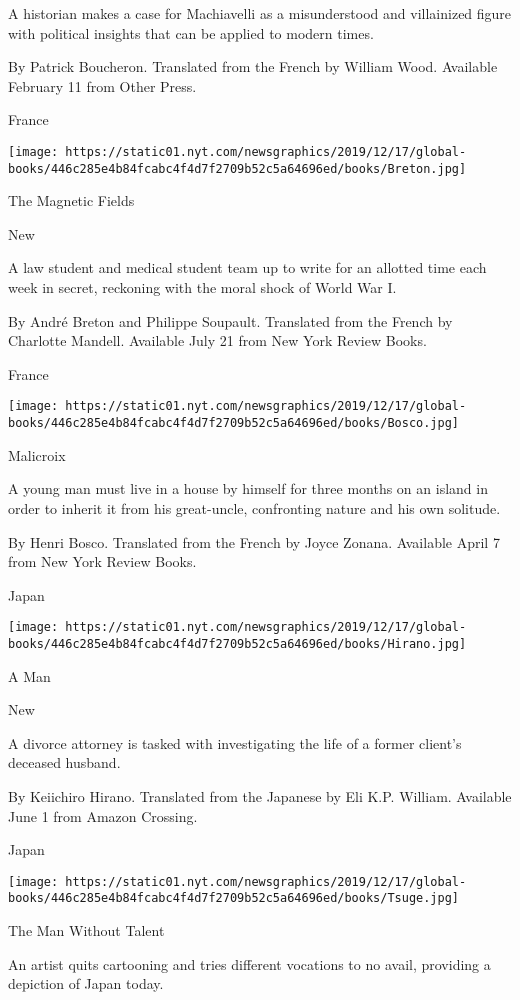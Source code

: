 A historian makes a case for Machiavelli as a misunderstood and
villainized figure with political insights that can be applied to modern
times.

 By Patrick Boucheron. Translated from the French by William Wood.
Available February 11 from Other Press.

France

\texttt{[image: https://static01.nyt.com/newsgraphics/2019/12/17/global-books/446c285e4b84fcabc4f4d7f2709b52c5a64696ed/books/Breton.jpg]}

The Magnetic Fields

New

A law student and medical student team up to write for an allotted time
each week in secret, reckoning with the moral shock of World War I.

 By André Breton and Philippe Soupault. Translated from the French by
Charlotte Mandell. Available July 21 from New York Review Books.

France

\texttt{[image: https://static01.nyt.com/newsgraphics/2019/12/17/global-books/446c285e4b84fcabc4f4d7f2709b52c5a64696ed/books/Bosco.jpg]}

Malicroix

A young man must live in a house by himself for three months on an
island in order to inherit it from his great-uncle, confronting nature
and his own solitude.

 By Henri Bosco. Translated from the French by Joyce Zonana. Available
April 7 from New York Review Books.

Japan

\texttt{[image: https://static01.nyt.com/newsgraphics/2019/12/17/global-books/446c285e4b84fcabc4f4d7f2709b52c5a64696ed/books/Hirano.jpg]}

A Man

New

A divorce attorney is tasked with investigating the life of a former
client's deceased husband.

 By Keiichiro Hirano. Translated from the Japanese by Eli K.P. William.
Available June 1 from Amazon Crossing.

Japan

\texttt{[image: https://static01.nyt.com/newsgraphics/2019/12/17/global-books/446c285e4b84fcabc4f4d7f2709b52c5a64696ed/books/Tsuge.jpg]}

The Man Without Talent

An artist quits cartooning and tries different vocations to no avail,
providing a depiction of Japan today.

